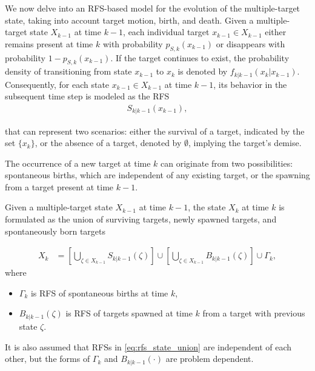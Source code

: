 We now delve into an RFS-based model for the evolution of the multiple-target state, taking into account target motion,
birth, and death. Given a multiple-target state $X_{k-1}$ at time $k-1$, each individual target $x_{k-1} \in X_{k-1}$ either remains present at time $k$ with probability $p_{S,k}(x_{k-1})$ or disappears with probability $1 - p_{S,k}(x_{k-1})$. If the target continues to exist, the probability density of transitioning from state $x_{k-1}$ to $x_k$ is denoted by $f_{k|k-1}(x_k|x_{k-1})$. Consequently, for each state $x_{k-1} \in X_{k-1}$ at time $k-1$, its behavior in the subsequent time step is modeled as the RFS
\begin{align}
    S_{k|k-1}(x_{k-1}),
\end{align}

that can represent two scenarios: either the survival of a target, indicated by the set $\{x_k\}$, or the absence of a
target, denoted by $\emptyset$, implying the target's demise.

The occurrence of a new target at time $k$ can originate from two possibilities: spontaneous births, which are independent of any existing target, or the spawning from a target present at time $k-1$.

Given a multiple-target state $X_{k-1}$ at time $k-1$, the state $X_k$ at time $k$ is formulated as the union of
surviving targets, newly spawned targets, and spontaneously born targets

\begin{align}
    X_k &= \left[\bigcup_{\zeta \in X_{k-1}}S_{k|k-1}(\zeta) \right] \cup \left[ \bigcup_{\zeta \in X_{k-1}} B_{k|k-1}(\zeta) \right] \cup \Gamma_k, \label{eq:rfs_state_union}
\end{align}
where
\begin{itemize}
    \item $\Gamma_k$ is RFS of spontaneous births at time $k$,
    \item $B_{k|k-1}(\zeta)$ is RFS of targets spawned at time $k$ from a target with previous state $\zeta$.
\end{itemize}
It is also assumed that RFSs in \eqref{eq:rfs_state_union} are independent of each other, but the forms of $\Gamma_k$
and $B_{k|k-1}(\cdot)$ are problem dependent.

